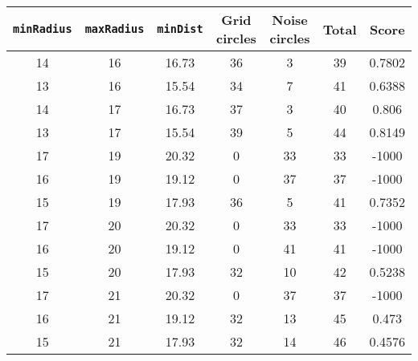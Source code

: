\documentclass[letterpaper, 12pt]{article}
\begin{document}
\begin{longtable}{|c|c|c|c|c|c|c|}
\hline
\textbf{\texttt{minRadius}} & \textbf{\texttt{maxRadius}} & \textbf{\texttt{minDist}} & \textbf{Grid circles} & \textbf{Noise circles} & \textbf{Total} & \textbf{Score} \\
\hline
14 & 16 & 16.73 & 36 & 3 & 39 & 0.7802 \\
\hline
13 & 16 & 15.54 & 34 & 7 & 41 & 0.6388 \\
\hline
14 & 17 & 16.73 & 37 & 3 & 40 & 0.806 \\
\hline
13 & 17 & 15.54 & 39 & 5 & 44 & 0.8149 \\
\hline
17 & 19 & 20.32 & 0 & 33 & 33 & -1000 \\
\hline
16 & 19 & 19.12 & 0 & 37 & 37 & -1000 \\
\hline
15 & 19 & 17.93 & 36 & 5 & 41 & 0.7352 \\
\hline
17 & 20 & 20.32 & 0 & 33 & 33 & -1000 \\
\hline
16 & 20 & 19.12 & 0 & 41 & 41 & -1000 \\
\hline
15 & 20 & 17.93 & 32 & 10 & 42 & 0.5238 \\
\hline
17 & 21 & 20.32 & 0 & 37 & 37 & -1000 \\
\hline
16 & 21 & 19.12 & 32 & 13 & 45 & 0.473 \\
\hline
15 & 21 & 17.93 & 32 & 14 & 46 & 0.4576 \\
\hline
\end{longtable}
\end{document}
